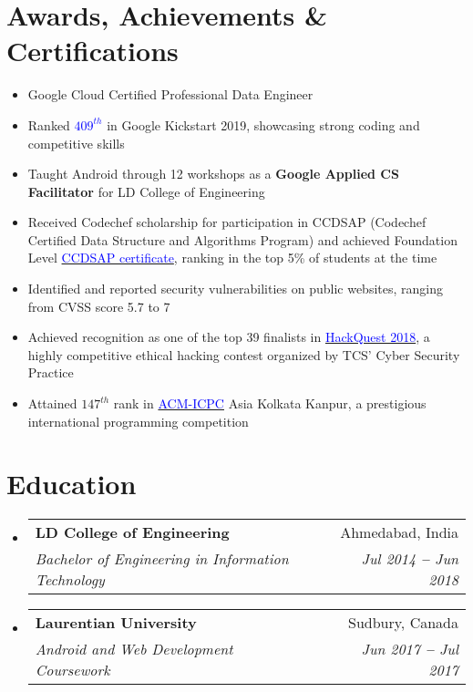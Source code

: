 \documentclass[letterpaper,11pt]{article}
\makeatletter
\newcommand{\resumeItem}[1]{
  \item\small{
    {#1 \vspace{-2pt}}
  }
}
\newcommand{\resumeSubheading}[4]{
  \vspace{-2pt}\item
    \begin{tabular*}{0.97\textwidth}[t]{l@{\extracolsep{\fill}}r}
      \textbf{#1} & #2 \\
      \textit{\small#3} & \textit{\small #4} \\
    \end{tabular*}\vspace{-7pt}
}
\newcommand{\resumeSubHeadingListStart}{\begin{itemize}[leftmargin=0.15in, label={}]}
\newcommand{\resumeSubHeadingListEnd}{\end{itemize}}
\newcommand{\resumeItemListStart}{\begin{itemize}}
\newcommand{\resumeItemListEnd}{\end{itemize}\vspace{-5pt}}
\makeatother
\begin{document}
\section{Awards, Achievements \& Certifications}
\vspace{2pt}
\resumeSubHeadingListStart
\small{\item{
              \resumeItemListStart
              \resumeItem{Google Cloud Certified Professional Data Engineer}
              \resumeItem{Ranked {\href{https://codingcompetitions.withgoogle.com/kickstart/round/0000000000050edd}{\textcolor{blue}{$409^{th}$}}}  in Google Kickstart 2019, showcasing strong coding and competitive skills}
              \resumeItem{Taught Android through 12 workshops as a \textbf{Google Applied CS Facilitator} for LD College of Engineering}
              \resumeItem{Received Codechef scholarship for participation in CCDSAP (Codechef Certified Data Structure and Algorithms Program) and achieved Foundation Level {\href{https://www.codechef.com/certificates/public/d2ef739}{\textcolor{blue}{CCDSAP certificate}}}, ranking in the top 5\% of students at the time}
              \resumeItem{Identified and reported security vulnerabilities on public websites, ranging from CVSS score 5.7 to 7}
              \resumeItem{Achieved recognition as one of the top 39 finalists in {\href{https://drive.google.com/file/d/1SxhoRm0vugUtpqTZGMbHX5BS0Gdx3D5k/view?usp=sharing}{\textcolor{blue}{HackQuest 2018}}}, a highly competitive ethical hacking contest organized by TCS' Cyber Security Practice}
              \resumeItem{Attained {$147^{th}$} rank in {\href{https://drive.google.com/file/d/19BKk_nhR-VvfI7R_30px68YTmWSB1CHY/view?usp=sharing}{\textcolor{blue}{ACM-ICPC}}} Asia Kolkata Kanpur, a prestigious international programming competition}
              \resumeItemListEnd
        }}
\resumeSubHeadingListEnd



\section{Education}
\vspace{3pt}
\resumeSubHeadingListStart
\resumeSubheading
{LD College of Engineering}{Ahmedabad, India}
{Bachelor of  Engineering in Information Technology}{Jul 2014 \textbf{--} Jun 2018}
\resumeSubheading
{Laurentian University}{Sudbury, Canada}
{Android and Web Development Coursework}{Jun 2017 \textbf{--} Jul 2017}
\resumeSubHeadingListEnd

\end{document}
